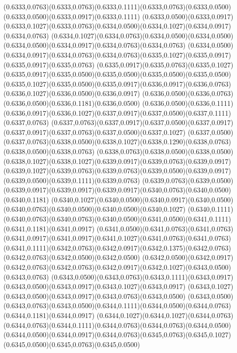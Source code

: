 (0.6333,0.0763)(0.6333,0.0763)(0.6333,0.1111)(0.6333,0.0763)(0.6333,0.0500)(0.6333,0.0500)(0.6333,0.0917)(0.6333,0.1111)
(0.6333,0.0500)(0.6333,0.0917)(0.6333,0.1027)(0.6333,0.0763)(0.6334,0.0500)(0.6334,0.1027)(0.6334,0.0917)(0.6334,0.0763)
(0.6334,0.1027)(0.6334,0.0763)(0.6334,0.0500)(0.6334,0.0500)(0.6334,0.0500)(0.6334,0.0917)(0.6334,0.0763)(0.6334,0.0763)
(0.6334,0.0500)(0.6334,0.0917)(0.6334,0.0763)(0.6334,0.0763)(0.6335,0.1027)(0.6335,0.0917)(0.6335,0.0917)(0.6335,0.0763)
(0.6335,0.0917)(0.6335,0.0763)(0.6335,0.1027)(0.6335,0.0917)(0.6335,0.0500)(0.6335,0.0500)(0.6335,0.0500)(0.6335,0.0500)
(0.6335,0.1027)(0.6335,0.0500)(0.6335,0.0917)(0.6336,0.0917)(0.6336,0.0763)(0.6336,0.1027)(0.6336,0.0500)(0.6336,0.0917)
(0.6336,0.0500)(0.6336,0.0763)(0.6336,0.0500)(0.6336,0.1181)(0.6336,0.0500)
\PST@Solid(0.6336,0.0500)(0.6336,0.1111)(0.6336,0.0917)(0.6336,0.1027)(0.6337,0.0917)(0.6337,0.0500)(0.6337,0.1111)(0.6337,0.0763)
(0.6337,0.0763)(0.6337,0.0917)(0.6337,0.0500)(0.6337,0.0917)(0.6337,0.0917)(0.6337,0.0763)(0.6337,0.0500)(0.6337,0.1027)
(0.6337,0.0500)(0.6337,0.0763)(0.6338,0.0500)(0.6338,0.1027)(0.6338,0.1290)(0.6338,0.0763)(0.6338,0.0500)(0.6338,0.0763)
(0.6338,0.0763)(0.6338,0.0500)(0.6338,0.0500)(0.6338,0.1027)(0.6338,0.1027)(0.6339,0.0917)(0.6339,0.0763)(0.6339,0.0917)
(0.6339,0.1027)(0.6339,0.0763)(0.6339,0.0763)(0.6339,0.0500)(0.6339,0.0917)(0.6339,0.0500)(0.6339,0.1111)(0.6339,0.0763)
(0.6339,0.0763)(0.6339,0.0500)(0.6339,0.0917)(0.6339,0.0917)(0.6339,0.0917)(0.6340,0.0763)(0.6340,0.0500)(0.6340,0.1181)
(0.6340,0.1027)(0.6340,0.0500)(0.6340,0.0917)(0.6340,0.0500)(0.6340,0.0763)(0.6340,0.0500)(0.6340,0.0500)(0.6340,0.1027)
(0.6340,0.1111)(0.6340,0.0763)(0.6340,0.0763)(0.6340,0.0500)(0.6341,0.0500)(0.6341,0.1111)(0.6341,0.1181)(0.6341,0.0917)
(0.6341,0.0500)(0.6341,0.0763)(0.6341,0.0763)(0.6341,0.0917)(0.6341,0.0917)(0.6341,0.1027)(0.6341,0.0763)(0.6341,0.0763)
(0.6341,0.1111)(0.6342,0.0763)(0.6342,0.0917)(0.6342,0.1375)(0.6342,0.0763)(0.6342,0.0763)(0.6342,0.0500)(0.6342,0.0500)
(0.6342,0.0500)(0.6342,0.0917)(0.6342,0.0763)(0.6342,0.0763)(0.6342,0.0917)(0.6342,0.1027)(0.6343,0.0500)(0.6343,0.0763)
(0.6343,0.0500)(0.6343,0.0763)(0.6343,0.1111)(0.6343,0.0917)(0.6343,0.0500)(0.6343,0.0917)(0.6343,0.1027)(0.6343,0.0917)
(0.6343,0.1027)(0.6343,0.0500)(0.6343,0.0917)(0.6343,0.0763)(0.6343,0.0500)
\PST@Solid(0.6343,0.0500)(0.6343,0.0763)(0.6343,0.0500)(0.6344,0.1111)(0.6344,0.0500)(0.6344,0.0763)(0.6344,0.1181)(0.6344,0.0917)
(0.6344,0.1027)(0.6344,0.1027)(0.6344,0.0763)(0.6344,0.0763)(0.6344,0.1111)(0.6344,0.0763)(0.6344,0.0763)(0.6344,0.0500)
(0.6344,0.0500)(0.6344,0.0917)(0.6344,0.0763)(0.6345,0.0763)(0.6345,0.1027)(0.6345,0.0500)(0.6345,0.0763)(0.6345,0.0500)
